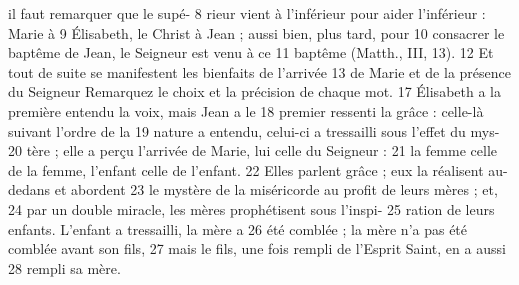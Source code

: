 il faut remarquer que le supé-	 
8	 	rieur vient à l'inférieur pour aider l'inférieur : Marie à	 
9	 	Élisabeth, le Christ à Jean ; aussi bien, plus tard, pour	 
10	 	consacrer le baptême de Jean, le Seigneur est venu à ce	 
11	 	baptême (Matth., III, 13).	 
12	 	Et tout de suite se manifestent les bienfaits de l'arrivée	 
13	 	de Marie et de la présence du Seigneur
Remarquez le choix et la précision de chaque mot.	 
17	 	Élisabeth a la première entendu la voix, mais Jean a le	 
18	 	premier ressenti la grâce : celle-là suivant l'ordre de la	 
19	 	nature a entendu, celui-ci a tressailli sous l'effet du mys-	 
20	 	tère ; elle a perçu l'arrivée de Marie, lui celle du Seigneur :	 
21	 	la femme celle de la femme, l'enfant celle de l'enfant.	 
22	 	Elles parlent grâce ; eux la réalisent au-dedans et abordent	 
23	 	le mystère de la miséricorde au profit de leurs mères ; et,	 
24	 	par un double miracle, les mères prophétisent sous l'inspi-	 
25	 	ration de leurs enfants. L'enfant a tressailli, la mère a	 
26	 	été comblée ; la mère n'a pas été comblée avant son fils,	 
27	 	mais le fils, une fois rempli de l'Esprit Saint, en a aussi	 
28	 	rempli sa mère.